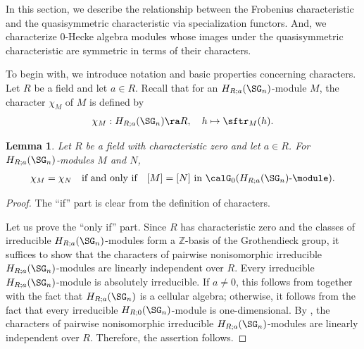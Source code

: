 \documentclass[12pt, reqno]{amsart}
\theoremstyle{plain}
\newtheorem{lemma}[lemma]{Lemma}
\theoremstyle{definition}
\numberwithin{equation}{section}
\numberwithin{figure}{section}
\numberwithin{table}{section}
\def\Z{\mathbb Z}
\begin{document}
In this section,  we describe the  relationship between the Frobenius characteristic and the quasisymmetric characteristic via specialization functors. 
And, we characterize $0$-Hecke algebra modules whose images under the quasisymmetric characteristic are symmetric in terms of their characters.



To begin with, we introduce notation and basic properties concerning characters.
Let $R$ be a field and let $a \in R$.
Recall that for an $H_{R;a}(\SG_n)$-module $M$, the character $\chi_M$ of $M$ is defined by 
\[
\chi_M : H_{R;a}(\SG_n) \ra R, \quad h \mapsto \sftr_{M}(h).
\]


\begin{lemma}\label{lem: char and Grothendieck}
Let $R$ be a field with characteristic zero and let $a \in R$.
For $H_{R;a}(\SG_n)$-modules $M$ and $N$,
\begin{align*}
\chi_M = \chi_N \quad\text{if and only if} \quad \text{$[M] = [N]$ in $\calG_0(H_{R;a}(\SG_n)\text{-}\module)$.}
\end{align*}
\end{lemma}

\begin{proof}
The ``if'' part is clear from the definition of characters.

Let us prove the ``only if'' part.
Since $R$ has characteristic zero and the classes of irreducible $H_{R;a}(\SG_n)$-modules form a $\Z$-basis of the Grothendieck group, it suffices to show that the  characters of pairwise nonisomorphic irreducible $H_{R;a}(\SG_n)$-modules are linearly independent over $R$.
Every irreducible $H_{R;a}(\SG_n)$-module is absolutely irreducible.
If $a\neq 0$, this follows from \cite[Theorem~3.4]{96GL} together with the fact that $H_{R;a}(\SG_n)$ is a cellular algebra; otherwise, it follows from the fact that every irreducible $H_{R;0}(\SG_n)$-module is one-dimensional.
By \cite[Theorem~2.3.13]{89NT}, the characters of pairwise nonisomorphic  irreducible $H_{R;a}(\SG_n)$-modules are linearly independent over $R$.
Therefore, the assertion follows.
\end{proof}
\end{document}
